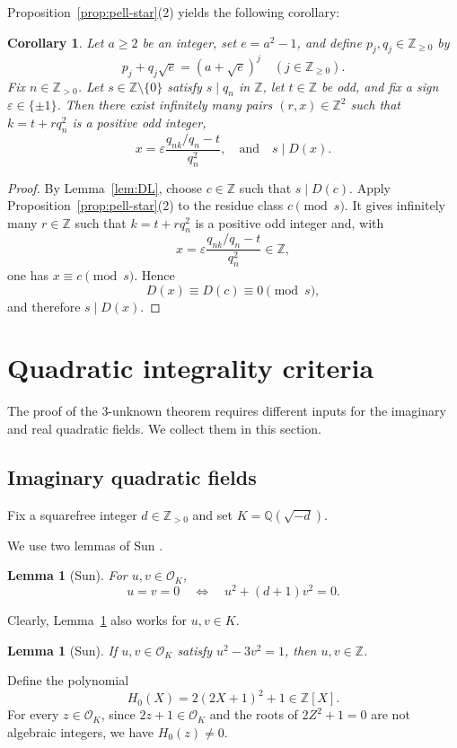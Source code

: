 \documentclass[12pt]{amsart}
\numberwithin{equation}{section}
\newtheorem{lemma}[theorem]{Lemma}
\newtheorem{corollary}[theorem]{Corollary}
\theoremstyle{remark}
\theoremstyle{plain}
\newcommand{\Z}{\mathbb{Z}}
\newcommand{\Q}{\mathbb{Q}}
\newcommand{\sO}{\mathcal{O}}
\begin{document}
Proposition~\ref{prop:pell-star}\textup{(2)} yields the following corollary:
\begin{corollary}\label{cor:reusex}
Let $a\geq2$ be an integer, set $e=a^2-1$, and define $p_j,q_j\in\Z_{\geq0}$ by
\[
p_j+q_j\sqrt{e}=(a+\sqrt{e})^j\quad(j\in\Z_{\geq0}).
\]
Fix $n\in\Z_{>0}$. Let $s\in\Z\setminus\{0\}$ satisfy $s\mid q_n$ in $\Z$, let $t\in\Z$ be odd, and fix a sign $\varepsilon\in\{\pm1\}$. Then there exist infinitely many pairs $(r,x)\in\Z^2$ such that $k=t+r q_n^2$ is a positive odd integer,
\[
x=\varepsilon\frac{q_{nk}/q_n-t}{q_n^2},\quad\text{and}\quad s\mid D(x).
\]
\end{corollary}
\begin{proof}
By Lemma~\ref{lem:DL}, choose $c\in\Z$ such that $s\mid D(c)$. Apply Proposition~\ref{prop:pell-star}\textup{(2)} to the residue class $c\pmod{s}$. It gives infinitely many $r\in\Z$ such that $k=t+r q_n^2$ is a positive odd integer and, with
\[
x=\varepsilon\frac{q_{nk}/q_n-t}{q_n^2}\in\Z,
\]
one has $x\equiv c\pmod{s}$. Hence
\[
D(x)\equiv D(c)\equiv0\pmod{s},
\]
and therefore $s\mid D(x)$.
\end{proof}

\section{Quadratic integrality criteria}\label{sec:quad-input}
The proof of the $3$-unknown theorem requires different inputs for the imaginary and real quadratic fields. We collect them in this section.

\subsection{Imaginary quadratic fields}
Fix a squarefree integer $d\in\Z_{>0}$ and set $K=\Q(\sqrt{-d})$.

We use two lemmas of Sun \cite[Lemmas~2.3 and~2.4]{Sun26}.
\begin{lemma}[Sun]\label{lem:anisotropic}
For $u,v\in\sO_K$,
\[
u=v=0\quad\Longleftrightarrow\quad u^2+(d+1)v^2=0.
\]
\end{lemma}
Clearly, Lemma~\ref{lem:anisotropic} also works for $u,v\in K$.

\begin{lemma}[Sun]\label{lem:imagPell}
If $u,v\in\sO_K$ satisfy $u^2-3v^2=1$, then $u,v\in\Z$.
\end{lemma}

Define the polynomial
\begin{equation}\label{eq:hdef}
H_0(X)=2(2X+1)^2+1\in\Z[X].
\end{equation}
For every $z\in\sO_K$, since $2z+1\in\sO_K$ and the roots of $2Z^2+1=0$ are not algebraic integers, we have $H_0(z)\neq0$.
\end{document}
